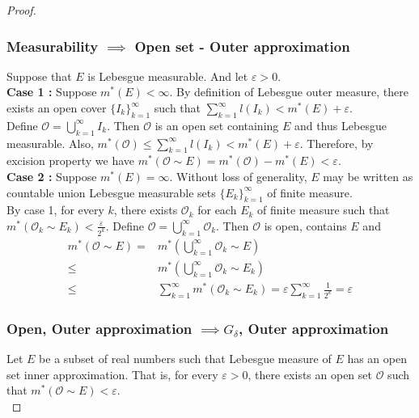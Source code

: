 \begin{proof}
\subsubsection*{Measurability $\implies$ Open set - Outer approximation}
	Suppose that $E$ is Lebesgue measurable.
	And let $\varepsilon > 0$.\\


	\textbf{Case 1 :} Suppose $m^\ast(E) < \infty$.
	By definition of Lebesgue outer measure, there exists an open cover $\{ I_k \}_{k=1}^\infty$ such that $\displaystyle \sum_{k=1}^\infty l(I_k) <  m^\ast(E)+\varepsilon$.\\

	Define $\mathcal{O} = \displaystyle \bigcup_{k=1}^\infty I_k$.
	Then $\mathcal{O}$ is an open set containing $E$ and thus Lebesgue measurable.
	Also, $\displaystyle m^\ast(\mathcal{O}) \le \sum_{k=1}^\infty l(I_k) < m^\ast(E) + \varepsilon$.
	Therefore, by excision property we have $m^\ast(\mathcal{O} \sim E) = m^\ast(\mathcal{O}) - m^\ast(E) < \varepsilon$. \\

	\textbf{Case 2 :} Suppose $m^\ast(E) = \infty$.
	Without loss of generality, $E$ may be written as countable union Lebesgue measurable sets $\{ E_k \}_{k=1}^\infty$ of finite measure.\\

	By case 1, for every $k$, there exists $\mathcal{O}_k$ for each $E_k$ of finite measure such that $m^\ast(\mathcal{O}_k \sim E_k) < \frac{\varepsilon}{2^k}$.
	Define $\displaystyle \mathcal{O} = \bigcup_{k=1}^\infty \mathcal{O}_k$.
	Then $\mathcal{O}$ is open, contains $E$ and 
	\begin{align*}
		m^\ast(\mathcal{O} \sim E) = & m^\ast\left(\bigcup_{k=1}^\infty \mathcal{O}_k \sim E \right) \\
		\le & m^\ast \left(\bigcup_{k=1}^\infty \mathcal{O}_k \sim E_k \right) \\
		\le & \sum_{k=1}^\infty m^\ast(\mathcal{O}_k \sim E_k) = \varepsilon \sum_{k=1}^\infty \frac{1}{2^k} = \varepsilon
	\end{align*}

\subsubsection*{Open, Outer approximation $\implies G_\delta$, Outer approximation }
	Let $E$ be a subset of real numbers such that Lebesgue measure of $E$ has an open set inner approximation.
	That is, for every $\varepsilon > 0$, there exists an open set $\mathcal{O}$ such that $m^\ast(\mathcal{O} \sim E) < \varepsilon$.\\


\end{proof}

